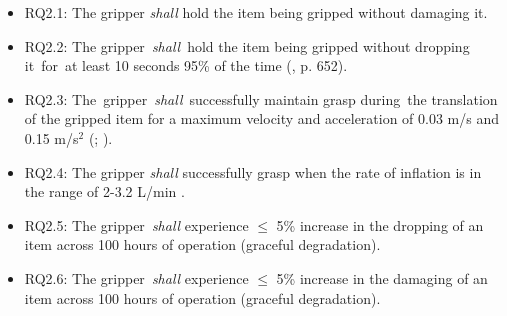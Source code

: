 \documentclass[lettersize,journal]{IEEEtran}
\begin{document}
\begin{itemize}
	\item RQ2.1: The gripper \emph{shall} hold the item being gripped without damaging it. 
	\item RQ2.2: The gripper \emph{shall} hold the item being gripped without dropping it for at least 10 seconds 95\% of the time (\cite{Sotiropoulos2018}, p. 652).
	\item RQ2.3: The gripper \emph{shall} successfully maintain grasp during the translation of the gripped item for a maximum velocity and acceleration of 0.03 m/s and 0.15 m/s$^2$ (\cite{Triantafyllou2019}; \cite{Cheng2021}).
	\item RQ2.4: The gripper \emph{shall} successfully grasp when the rate of inflation is in the range of 2-3.2 L/min \cite{DEWIN2022}.
	\item RQ2.5: The gripper \emph{shall} experience $\le$ 5\% increase in the dropping of an item across 100 hours of operation (graceful degradation). %
	\item RQ2.6: The gripper \emph{shall} experience $\le$ 5\% increase in the damaging of an item across 100 hours of operation (graceful degradation).  %
\end{itemize}
\end{document}
